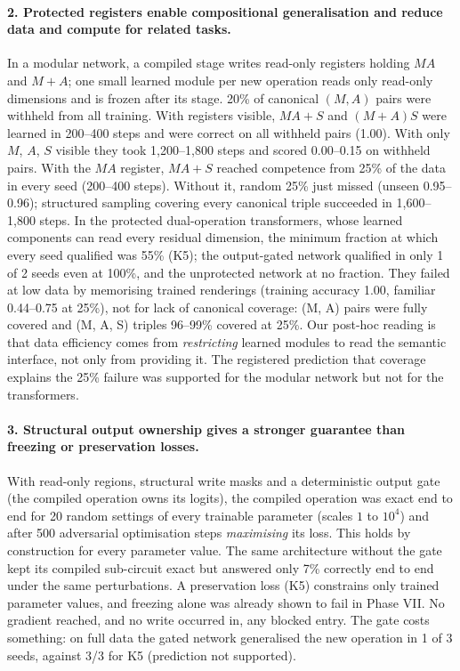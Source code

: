 \documentclass[11pt]{article}
\begin{document}
\paragraph{2. Protected registers enable compositional generalisation and reduce data and compute for related
tasks.} In a modular network, a compiled stage writes read-only registers holding $MA$ and $M+A$; one small learned
module per new operation reads only read-only dimensions and is frozen after its stage. 20\% of canonical $(M,A)$ pairs
were withheld from all training. With registers visible, $MA+S$ and $(M+A)S$ were learned in 200--400 steps and were
correct on all withheld pairs (1.00). With only $M$, $A$, $S$ visible they took 1,200--1,800 steps and scored 0.00--0.15
on withheld pairs. With the $MA$ register, $MA+S$ reached competence from 25\% of the data in every seed (200--400
steps). Without it, random 25\% just missed (unseen 0.95--0.96); structured sampling covering every canonical triple
succeeded in 1,600--1,800 steps. In the protected dual-operation transformers, whose learned components can read
every residual dimension, the minimum fraction at which every seed qualified was 55\% (K5); the output-gated network
qualified in only 1 of 2 seeds even at 100\%, and the unprotected network at no fraction. They failed at low data by
memorising trained renderings (training accuracy 1.00, familiar 0.44--0.75 at 25\%), not for lack of canonical coverage:
(M, A) pairs were fully covered and (M, A, S) triples 96--99\% covered at 25\%. Our post-hoc reading is that data
efficiency comes from \emph{restricting} learned modules to read the semantic interface, not only from providing it.
The registered prediction that coverage explains the 25\% failure was supported for the modular network but not for the
transformers.

\paragraph{3. Structural output ownership gives a stronger guarantee than freezing or preservation losses.} With
read-only regions, structural write masks and a deterministic output gate (the compiled operation owns its logits),
the compiled operation was exact end to end for 20 random settings of every trainable parameter (scales $1$ to $10^4$)
and after 500 adversarial optimisation steps \emph{maximising} its loss. This holds by construction for every parameter
value. The same architecture without the gate kept its compiled sub-circuit exact but answered only 7\% correctly
end to end under the same perturbations. A preservation loss (K5) constrains only trained parameter values, and freezing
alone was already shown to fail in Phase VII. No gradient reached, and no write occurred in, any blocked entry. The
gate costs something: on full data the gated network generalised the new operation in 1 of 3 seeds, against 3/3 for
K5 (prediction not supported).
\end{document}
